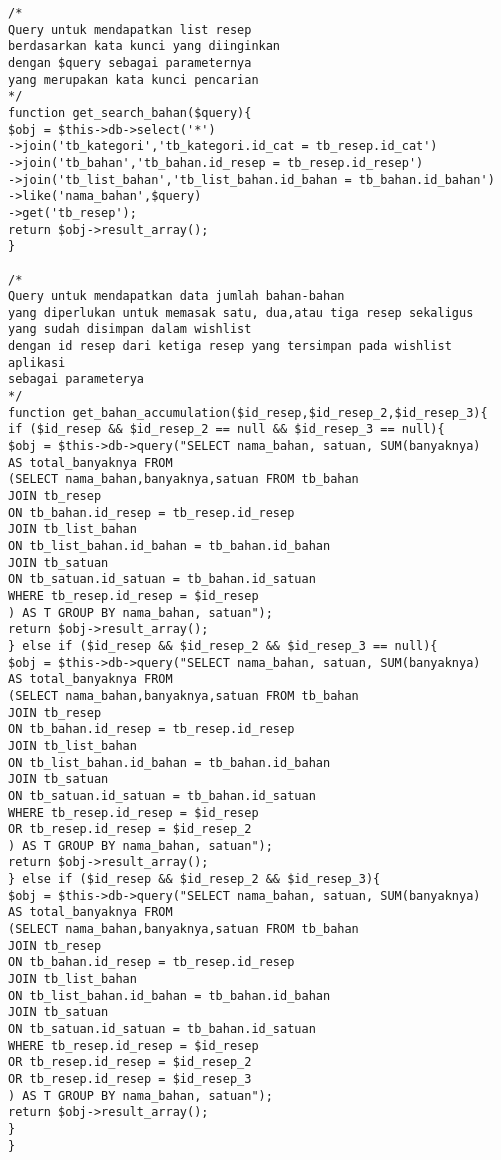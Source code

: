 \documentclass{jtetiskripsi}
\begin{document}
\begin{lstlisting}
/*
Query untuk mendapatkan list resep
berdasarkan kata kunci yang diinginkan
dengan $query sebagai parameternya
yang merupakan kata kunci pencarian
*/
function get_search_bahan($query){
$obj = $this->db->select('*')
->join('tb_kategori','tb_kategori.id_cat = tb_resep.id_cat')
->join('tb_bahan','tb_bahan.id_resep = tb_resep.id_resep')
->join('tb_list_bahan','tb_list_bahan.id_bahan = tb_bahan.id_bahan')
->like('nama_bahan',$query)
->get('tb_resep');
return $obj->result_array();
}

/*
Query untuk mendapatkan data jumlah bahan-bahan
yang diperlukan untuk memasak satu, dua,atau tiga resep sekaligus
yang sudah disimpan dalam wishlist
dengan id resep dari ketiga resep yang tersimpan pada wishlist aplikasi
sebagai parameterya
*/
function get_bahan_accumulation($id_resep,$id_resep_2,$id_resep_3){
if ($id_resep && $id_resep_2 == null && $id_resep_3 == null){
$obj = $this->db->query("SELECT nama_bahan, satuan, SUM(banyaknya)
AS total_banyaknya FROM
(SELECT nama_bahan,banyaknya,satuan FROM tb_bahan
JOIN tb_resep
ON tb_bahan.id_resep = tb_resep.id_resep
JOIN tb_list_bahan
ON tb_list_bahan.id_bahan = tb_bahan.id_bahan
JOIN tb_satuan
ON tb_satuan.id_satuan = tb_bahan.id_satuan
WHERE tb_resep.id_resep = $id_resep
) AS T GROUP BY nama_bahan, satuan");
return $obj->result_array();
} else if ($id_resep && $id_resep_2 && $id_resep_3 == null){
$obj = $this->db->query("SELECT nama_bahan, satuan, SUM(banyaknya)
AS total_banyaknya FROM
(SELECT nama_bahan,banyaknya,satuan FROM tb_bahan
JOIN tb_resep
ON tb_bahan.id_resep = tb_resep.id_resep
JOIN tb_list_bahan
ON tb_list_bahan.id_bahan = tb_bahan.id_bahan
JOIN tb_satuan
ON tb_satuan.id_satuan = tb_bahan.id_satuan
WHERE tb_resep.id_resep = $id_resep
OR tb_resep.id_resep = $id_resep_2
) AS T GROUP BY nama_bahan, satuan");
return $obj->result_array();
} else if ($id_resep && $id_resep_2 && $id_resep_3){
$obj = $this->db->query("SELECT nama_bahan, satuan, SUM(banyaknya)
AS total_banyaknya FROM
(SELECT nama_bahan,banyaknya,satuan FROM tb_bahan
JOIN tb_resep
ON tb_bahan.id_resep = tb_resep.id_resep
JOIN tb_list_bahan
ON tb_list_bahan.id_bahan = tb_bahan.id_bahan
JOIN tb_satuan
ON tb_satuan.id_satuan = tb_bahan.id_satuan
WHERE tb_resep.id_resep = $id_resep
OR tb_resep.id_resep = $id_resep_2
OR tb_resep.id_resep = $id_resep_3
) AS T GROUP BY nama_bahan, satuan");
return $obj->result_array();
}
}


\end{lstlisting}
\end{document}

